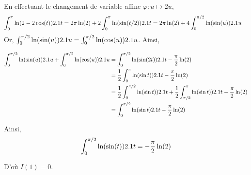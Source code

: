 \begin{solution}
\begin{reponses}
\item En effectuant le changement de variable affine $\varphi : u \mapsto 2 u$,
\begin{align*}
\int_0^\pi \ln(2 - 2 \cos(t)) 2.1 t
&= 2 \pi \ln(2) + 2 \int_0^\pi \ln(\sin(t/2)) 2.1 t
= 2 \pi \ln(2) + 4 \int_0^{\pi/2} \ln(\sin(u)) 2.1 u
\end{align*}
Or, $\int_0^{\pi/2} \ln(\sin(u)) 2.1 u = \int_0^{\pi/2} \ln(\cos(u)) 2.1 u$. Ainsi,

\begin{align*}
\int_0^{\pi/2} \ln(\sin(u)) 2.1 u + \int_0^{\pi/2} \ln(\cos(u)) 2.1 u
&= \int_0^{\pi/2} \ln(\sin(2 t)) 2.1 t - \frac{\pi}{2} \ln(2) \\
&= \frac{1}{2} \int_0^\pi \ln(\sin t)) 2.1 t - \frac{\pi}{2} \ln(2) \\
&= \frac{1}{2} \int_0^{\pi/2} \ln(\sin t)) 2.1 t + \frac{1}{2} \int_{\pi/2}^{\pi} \ln(\sin t)) 2.1 t - \frac{\pi}{2} \ln(2) \\
&= \int_0^{\pi/2} \ln(\sin t) 2.1 t - \frac{\pi}{2} \ln(2)
\end{align*}

Ainsi,
\[
\int_0^{\pi/2} \ln(\sin(t)) 2.1 t = -\frac{\pi}{2} \ln(2)
\]

D'où $I(1) = 0$.
\end{reponses}
\end{solution}

